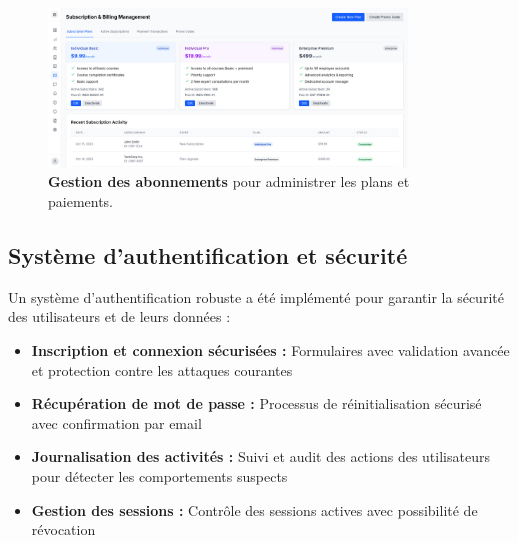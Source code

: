\begin{figure}[h!]
  \centering
  \includegraphics[width=0.85\textwidth,keepaspectratio]{old-reports/week_4_img/sub.jpeg}
  \caption{\textbf{Gestion des abonnements} pour administrer les plans et paiements.}
  \label{fig:subscription_management}
\end{figure}

\subsection{Système d'authentification et sécurité}

Un système d'authentification robuste a été implémenté pour garantir la sécurité des utilisateurs et de leurs données :

\begin{itemize}
  \item \textbf{Inscription et connexion sécurisées :} Formulaires avec validation avancée et protection contre les attaques courantes
  \item \textbf{Récupération de mot de passe :} Processus de réinitialisation sécurisé avec confirmation par email
  \item \textbf{Journalisation des activités :} Suivi et audit des actions des utilisateurs pour détecter les comportements suspects
  \item \textbf{Gestion des sessions :} Contrôle des sessions actives avec possibilité de révocation
\end{itemize}

